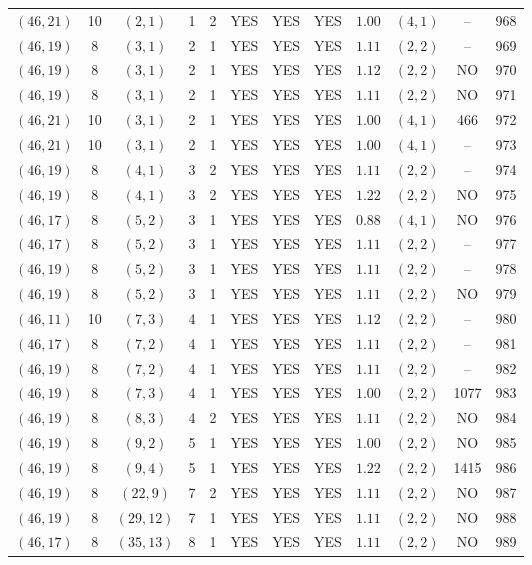 \begin{longtable}{|c|c|c|c|c|c|c|c|c|c|c|c|}
$(46,21)$ & 10 & $(2,1)$ & 1 & 2 & YES & YES & YES & $1.00$ & $(4,1)$ & -- & 968\\
$(46,19)$ & 8 & $(3,1)$ & 2 & 1 & YES & YES & YES & $1.11$ & $(2,2)$ & -- & 969\\
$(46,19)$ & 8 & $(3,1)$ & 2 & 1 & YES & YES & YES & $1.12$ & $(2,2)$ & NO & 970\\
$(46,19)$ & 8 & $(3,1)$ & 2 & 1 & YES & YES & YES & $1.11$ & $(2,2)$ & NO & 971\\
$(46,21)$ & 10 & $(3,1)$ & 2 & 1 & YES & YES & YES & $1.00$ & $(4,1)$ & 466 & 972\\
$(46,21)$ & 10 & $(3,1)$ & 2 & 1 & YES & YES & YES & $1.00$ & $(4,1)$ & -- & 973\\
$(46,19)$ & 8 & $(4,1)$ & 3 & 2 & YES & YES & YES & $1.11$ & $(2,2)$ & -- & 974\\
$(46,19)$ & 8 & $(4,1)$ & 3 & 2 & YES & YES & YES & $1.22$ & $(2,2)$ & NO & 975\\
$(46,17)$ & 8 & $(5,2)$ & 3 & 1 & YES & YES & YES & $0.88$ & $(4,1)$ & NO & 976\\
$(46,17)$ & 8 & $(5,2)$ & 3 & 1 & YES & YES & YES & $1.11$ & $(2,2)$ & -- & 977\\
$(46,19)$ & 8 & $(5,2)$ & 3 & 1 & YES & YES & YES & $1.11$ & $(2,2)$ & -- & 978\\
$(46,19)$ & 8 & $(5,2)$ & 3 & 1 & YES & YES & YES & $1.11$ & $(2,2)$ & NO & 979\\
$(46,11)$ & 10 & $(7,3)$ & 4 & 1 & YES & YES & YES & $1.12$ & $(2,2)$ & -- & 980\\
$(46,17)$ & 8 & $(7,2)$ & 4 & 1 & YES & YES & YES & $1.11$ & $(2,2)$ & -- & 981\\
$(46,19)$ & 8 & $(7,2)$ & 4 & 1 & YES & YES & YES & $1.11$ & $(2,2)$ & -- & 982\\
$(46,19)$ & 8 & $(7,3)$ & 4 & 1 & YES & YES & YES & $1.00$ & $(2,2)$ & 1077 & 983\\
$(46,19)$ & 8 & $(8,3)$ & 4 & 2 & YES & YES & YES & $1.11$ & $(2,2)$ & NO & 984\\
$(46,19)$ & 8 & $(9,2)$ & 5 & 1 & YES & YES & YES & $1.00$ & $(2,2)$ & NO & 985\\
$(46,19)$ & 8 & $(9,4)$ & 5 & 1 & YES & YES & YES & $1.22$ & $(2,2)$ & 1415 & 986\\
$(46,19)$ & 8 & $(22,9)$ & 7 & 2 & YES & YES & YES & $1.11$ & $(2,2)$ & NO & 987\\
$(46,19)$ & 8 & $(29,12)$ & 7 & 1 & YES & YES & YES & $1.11$ & $(2,2)$ & NO & 988\\
$(46,17)$ & 8 & $(35,13)$ & 8 & 1 & YES & YES & YES & $1.11$ & $(2,2)$ & NO & 989\\

\end{longtable}
